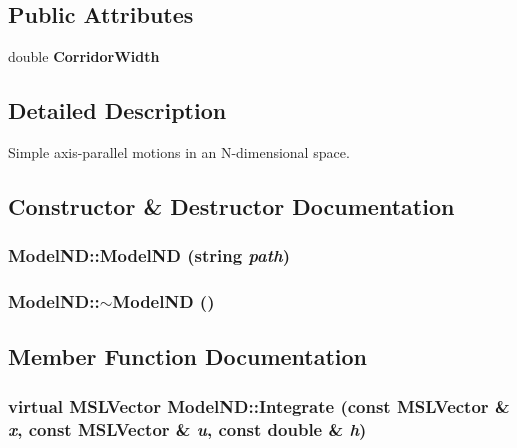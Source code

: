 \subsection*{Public Attributes}
\begin{CompactItemize}
\item 
double {\bf Corridor\-Width}
\end{CompactItemize}


\subsection{Detailed Description}
Simple axis-parallel motions in an N-dimensional space.



\subsection{Constructor \& Destructor Documentation}
\subsubsection{\setlength{\rightskip}{0pt plus 5cm}Model\-ND::Model\-ND (string {\em path})}\label{class_ModelND_a0}


\subsubsection{\setlength{\rightskip}{0pt plus 5cm}Model\-ND::$\sim$Model\-ND ()\hspace{0.3cm}{\tt  [inline, virtual]}}\label{class_ModelND_a1}




\subsection{Member Function Documentation}
\subsubsection{\setlength{\rightskip}{0pt plus 5cm}virtual {\bf MSLVector} Model\-ND::Integrate (const {\bf MSLVector} \& {\em x}, const {\bf MSLVector} \& {\em u}, const double \& {\em h})\hspace{0.3cm}{\tt  [virtual]}}\label{class_ModelND_a3}



